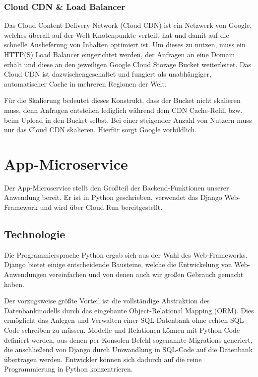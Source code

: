 \documentclass{article}
\begin{document}
\subsubsection{Cloud CDN \& Load Balancer}

Das Cloud Content Delivery Network (Cloud CDN) ist ein Netzwerk von Google, welches überall auf der Welt Knotenpunkte verteilt hat und damit auf die schnelle Auslieferung von Inhalten optimiert ist. Um dieses zu nutzen, muss ein HTTP(S) Load Balancer eingerichtet werden, der Anfragen an eine Domain erhält und diese an den jeweiligen Google Cloud Storage Bucket weiterleitet. Das Cloud CDN ist dazwischengeschaltet und fungiert als unabhängiger, automatischer Cache in mehreren Regionen der Welt.

Für die Skalierung bedeutet dieses Konstrukt, dass der Bucket nicht skalieren muss, denn Anfragen entstehen lediglich während dem CDN Cache-Refill bzw. beim Upload in den Bucket selbst. Bei einer steigender Anzahl von Nutzern muss nur das Cloud CDN skalieren. Hierfür sorgt Google vorbildlich.


\section{App-Microservice} %
\label{sec:app-microservice}

Der App-Microservice stellt den Großteil der Backend-Funktionen unserer Anwendung bereit. Er ist in Python geschrieben, verwendet das Django Web-Framework und wird über Cloud Run bereitgestellt.


\subsection{Technologie}

Die Programmiersprache Python ergab sich aus der Wahl des Web-Frameworks. Django bietet einige entscheidende Bausteine, welche die Entwickelung von Web-Anwendungen vereinfachen und von denen auch wir großen Gebrauch gemacht haben. 

Der vorzugsweise größte Vorteil ist die vollständige Abstraktion des Datenbankmodells durch das eingebaute Object-Relational Mapping (ORM). Dies ermöglicht das Anlegen und Verwalten einer SQL-Datenbank ohne echten SQL-Code schreiben zu müssen. Modelle und Relationen können mit Python-Code definiert werden, aus denen per Konsolen-Befehl sogenannte Migrations generiert, die anschließend von Django durch Umwandlung in SQL-Code auf die Datenbank übertragen werden. Entwickler können sich dadurch auf die reine Programmierung in Python konzentrieren. 
\end{document}
